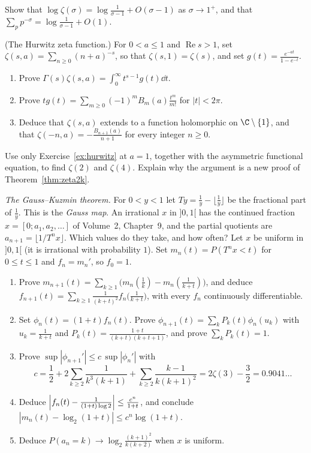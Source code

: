 \begin{exercise}[$\star\star$]\label{ex:primesum}
Show that $\log\zeta(\sigma)=\log\frac1{\sigma-1}+O(\sigma-1)$ as $\sigma\to1^+$, and that $\sum_pp^{-\sigma}=\log\frac1{\sigma-1}+O(1)$.
\end{exercise}

\begin{exercise}[$\star\star\star$]\label{ex:hurwitz}
(The Hurwitz zeta function.) For $0<a\le1$ and $\operatorname{Re}s>1$, set $\zeta(s,a)=\sum_{n\ge0}(n+a)^{-s}$, so that $\zeta(s,1)=\zeta(s)$, and set $g(t)=\frac{e^{-at}}{1-e^{-t}}$.
\begin{enumerate}[label=(\alph*)]
\item Prove $\Gamma(s)\zeta(s,a)=\int_0^\infty t^{s-1}g(t)\dd t$.
\item Prove $tg(t)=\sum_{m\ge0}(-1)^mB_m(a)\frac{t^m}{m!}$ for $|t|<2\pi$.
\item Deduce that $\zeta(s,a)$ extends to a function holomorphic on $\C\setminus\{1\}$, and that $\zeta(-n,a)=-\frac{B_{n+1}(a)}{n+1}$ for every integer $n\ge0$.
\end{enumerate}
\end{exercise}

\begin{exercise}[$\star\star$]\label{ex:zeta2fe}
Use only Exercise~\ref{ex:hurwitz} at $a=1$, together with the asymmetric functional equation, to find $\zeta(2)$ and $\zeta(4)$. Explain why the argument is a new proof of Theorem~\ref{thm:zeta2k}.
\end{exercise}

\begin{exercise}[$\star\star\star$]\label{pb:gausskuzmin}
\emph{The Gauss--Kuzmin theorem.} For $0<y<1$ let $Ty=\frac1y-\lfloor\frac1y\rfloor$ be the fractional part of $\frac1y$. This is the \emph{Gauss map}. An irrational $x$ in $]0,1[$ has the continued fraction $x=[0;a_1,a_2,\dots]$ of Volume~2, Chapter~9, and the partial quotients are $a_{n+1}=\lfloor1/T^nx\rfloor$. Which values do they take, and how often? Let $x$ be uniform in $]0,1[$ (it is irrational with probability $1$). Set $m_n(t)=P(T^nx<t)$ for $0\le t\le1$ and $f_n=m_n'$, so $f_0=1$.
\begin{enumerate}[label=(\alph*)]
\item Prove $m_{n+1}(t)=\sum_{k\ge1}\bigl(m_n(\frac1k)-m_n(\frac1{k+t})\bigr)$, and deduce $f_{n+1}(t)=\sum_{k\ge1}\frac1{(k+t)^2}f_n\bigl(\frac1{k+t}\bigr)$, with every $f_n$ continuously differentiable.
\item Set $\phi_n(t)=(1+t)f_n(t)$. Prove $\phi_{n+1}(t)=\sum_kP_k(t)\phi_n(u_k)$ with $u_k=\frac1{k+t}$ and $P_k(t)=\frac{1+t}{(k+t)(k+t+1)}$, and prove $\sum_kP_k(t)=1$.
\item Prove $\sup|\phi_{n+1}'|\le c\,\sup|\phi_n'|$ with
\[
c=\frac12+2\sum_{k\ge2}\frac1{k^3(k+1)}+\sum_{k\ge2}\frac{k-1}{k(k+1)^2}=2\zeta(3)-\frac32=0.9041\ldots
\]
\item Deduce $\Bigl|f_n(t)-\frac1{(1+t)\log2}\Bigr|\le\frac{c^n}{1+t}$, and conclude $|m_n(t)-\log_2(1+t)|\le c^n\log(1+t)$.
\item Deduce $P(a_n=k)\to\log_2\frac{(k+1)^2}{k(k+2)}$ when $x$ is uniform.
\end{enumerate}
\end{exercise}

